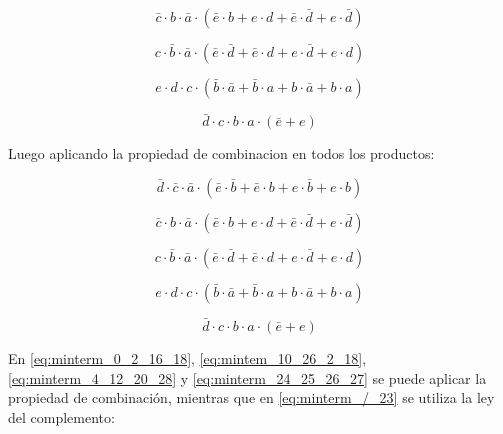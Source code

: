 \begin{equation}\label{eq:mintem_10_26_2_18}
\bar{c} \cdot b \cdot \bar{a} \cdot (\bar{e} \cdot b + e 	\cdot d + \bar{e} \cdot \bar{d} + e \cdot \bar{d})
\end{equation}

\begin{equation}\label{eq:minterm_4_12_20_28}
c \cdot \bar{b} \cdot \bar{a} \cdot (\bar{e} \cdot \bar{d} + \bar{e} \cdot d + e \cdot \bar{d} + e \cdot d)
\end{equation}

\begin{equation}\label{eq:minterm_24_25_26_27}
e \cdot d \cdot c \cdot (\bar{b} \cdot \bar{a} + \bar{b} \cdot a + b \cdot \bar{a} + b \cdot a)
\end{equation}

\begin{equation}\label{eq:minterm_/_23}
\bar{d} \cdot c \cdot b \cdot a \cdot (\bar{e} + e)
\end{equation}

Luego aplicando la propiedad de combinacion en todos los productos:

\begin{equation}\label{eq:minterm_0_2_16_18}
\bar{d} \cdot \bar{c} \cdot \bar{a} \cdot (\bar{e} \cdot \bar{b} + \bar{e} \cdot b + e \cdot \bar{b} + e \cdot b)
\end{equation}

\begin{equation}\label{eq:mintem_10_26_2_18}
\bar{c} \cdot b \cdot \bar{a} \cdot (\bar{e} \cdot b + e 	\cdot d + \bar{e} \cdot \bar{d} + e \cdot \bar{d})
\end{equation}

\begin{equation}\label{eq:minterm_4_12_20_28}
c \cdot \bar{b} \cdot \bar{a} \cdot (\bar{e} \cdot \bar{d} + \bar{e} \cdot d + e \cdot \bar{d} + e \cdot d)
\end{equation}

\begin{equation}\label{eq:minterm_24_25_26_27}
e \cdot d \cdot c \cdot (\bar{b} \cdot \bar{a} + \bar{b} \cdot a + b \cdot \bar{a} + b \cdot a)
\end{equation}

\begin{equation}\label{eq:minterm_7_23}
\bar{d} \cdot c \cdot b \cdot a \cdot (\bar{e} + e)
\end{equation}


En \ref{eq:minterm_0_2_16_18}, \ref{eq:mintem_10_26_2_18}, \ref{eq:minterm_4_12_20_28} y \ref{eq:minterm_24_25_26_27} se puede aplicar la propiedad de combinación, mientras que en \ref{eq:minterm_/_23} se utiliza la ley del complemento:

